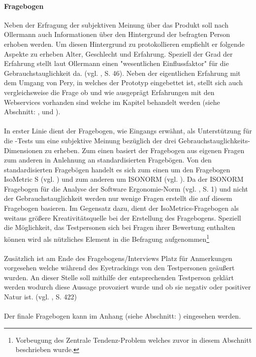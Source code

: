 \documentclass[Bachelorarbeit.tex]{subfiles}
\begin{document}
\paragraph{Fragebogen}
Neben der Erfragung der subjektiven Meinung über das Produkt soll nach Ollermann auch Informationen über den Hintergrund der befragten Person erhoben werden.
Um diesen Hintergrund zu protokollieren empfiehlt er folgende Aspekte zu erheben Alter, Geschlecht und Erfahrung.
Speziell der Grad der Erfahrung stellt laut Ollermann einen "wesentlichen Einflussfaktor" für die Gebrauchstauglichkeit da. (vgl. \cite{Ollermann2007}, S. 46). 
Neben der eigentlichen Erfahrung mit dem Umgang von Pery, in welches der Prototyp eingebettet ist, stellt sich auch vergleichsweise die Frage ob und wie ausgeprägt Erfahrungen mit den Webservices vorhanden sind welche im Kapitel  behandelt werden (siehe Abschnitt: ,  und ).\\
\\
In erster Linie dient der Fragebogen, wie Eingangs erwähnt, als Unterstützung für die -Tests um eine subjektive Meinung bezüglich der drei Gebrauchstauglichkeits-Dimensionen zu erheben. 
Zum einen basiert der Fragebogen aus eigenen Fragen zum anderen in Anlehnung an standardisierten Fragebögen.
Von den standardisierten Fragebögen handelt es sich zum einen um den Fragebogen IsoMetric S (vgl. \cite{IsoMetricS}) und zum anderen um ISONORM (vgl. \cite{IsonormL}).
Da der ISONORM Fragebogen für die Analyse der Software Ergonomie-Norm (vgl. \cite{IsonormL}, S. 1) und nicht der Gebrauchstauglichkeit werden nur wenige Fragen erstellt die auf diesem Fragebogen basieren.
Im Gegensatz dazu, dient der IsoMetrics-Fragebogen als weitaus größere Kreativitätsquelle bei der Erstellung des Fragebogens.
Speziell die Möglichkeit, das Testpersonen sich bei Fragen ihrer Bewertung enthalten können wird als nützliches Element in die Befragung aufgenommen\footnote{Vorbeugung des Zentrale Tendenz-Problem welches zuvor in diesem Abschnitt beschrieben wurde.}\\
\\
Zusätzlich ist am Ende des Fragebogens/Interviews Platz für Anmerkungen vorgesehen welche während des Eyetrackings von den Testpersonen geäußert wurden.
An dieser Stelle soll mithilfe der entsprechenden Testperson geklärt werden wodurch diese Aussage provoziert wurde und ob sie negativ oder positiver Natur ist. (vgl. \cite{Niegemann2008}, S. 422)\\
\\
Der finale Fragebogen kann im Anhang (siehe Abschnitt: ) eingesehen werden.
\end{document}
